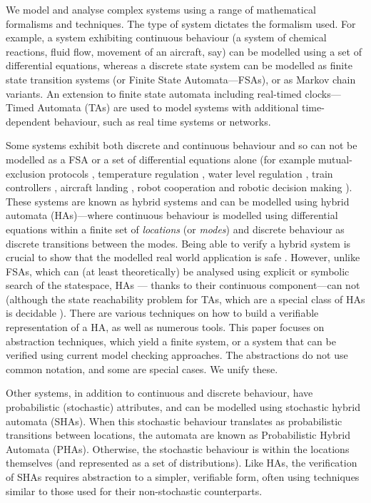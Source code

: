 We model and analyse complex systems using a range of mathematical formalisms and techniques. The type of system dictates the formalism used. For example, a system exhibiting continuous behaviour (a system of chemical reactions, fluid flow, movement of an aircraft, say) can be modelled using a set of differential equations, whereas a discrete state system can be modelled as finite state transition systems (or Finite State Automata---FSAs), or as Markov chain variants. An extension to finite state automata including real-timed clocks---Timed Automata (TAs) are used to model systems with additional time-dependent behaviour, such as real time systems or networks.


Some systems exhibit both discrete and continuous behaviour and so can not be modelled as a FSA or a set of differential equations alone (for example mutual-exclusion protocols \cite{Alur1995a}, temperature regulation \cite{Nicollin1993,Amin2006,Raskin2005}, water level regulation \cite{Alur1993}, train controllers \cite{Platzer2011a}, aircraft landing \cite{Tomlin2003}, robot cooperation \cite{Chaimowicz2003} and robotic decision making \cite{Dennis2013}).
These systems are known as hybrid systems and can be modelled using hybrid automata (HAs)---where continuous behaviour is modelled using differential equations within a finite set of {\it locations} (or {\it modes}) and discrete behaviour as discrete transitions between the modes. Being able to verify a hybrid system is crucial to show that the modelled real world application is safe \cite{Livadas1998a,Prajna2007}. However, unlike FSAs, which can (at least theoretically) be analysed using explicit or symbolic search of the statespace, HAs --- thanks to their continuous component---can not (although the state reachability problem for TAs, which are a special class of HAs is decidable \cite{Alur1994}).
There are various techniques on how to build a verifiable representation of a HA, as well as numerous tools. This paper focuses on abstraction techniques, which yield a finite system, or a system that can be verified using current model checking approaches. The abstractions do not use common notation, and some are special cases. We unify these.

Other systems, in addition to continuous and discrete behaviour, have probabilistic (stochastic) attributes, and can be modelled using stochastic hybrid automata (SHAs). When this stochastic behaviour translates as probabilistic transitions between locations, the automata are known as Probabilistic Hybrid Automata (PHAs). Otherwise, the stochastic behaviour is within the locations themselves (and represented as a set of distributions).
Like HAs, the verification of SHAs requires abstraction to a simpler, verifiable form, often using techniques similar to those used for their non-stochastic counterparts.

